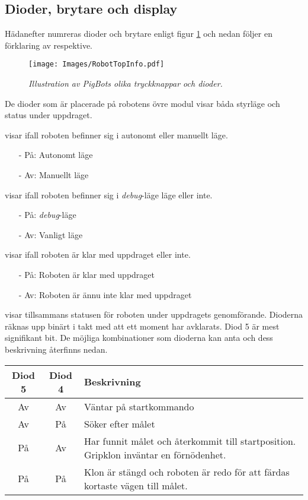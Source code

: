 \documentclass[11pt]{article}
\begin{document}
\subsection{Dioder, brytare och display}
Hädanefter numreras dioder och brytare enligt figur \ref{picTop} och nedan följer en förklaring av respektive.

\begin{figure}[htbp]
	\centering
	\texttt{[image: Images/RobotTopInfo.pdf]}
	\caption{\textit{Illustration av PigBots olika tryckknappar och dioder.} \label{picTop}}
\end{figure}

De dioder som är placerade på robotens övre modul visar båda styrläge och status under uppdraget.
\begin{description}[style=unboxed, leftmargin=0cm]
  \item[Diod 1] visar ifall roboten befinner sig i autonomt eller manuellt läge. 
    \begin{itemize}
      \setlength\itemsep{-0.5em}
      \item[-] På: Autonomt läge 
      \item[-] Av: Manuellt läge
    \end{itemize}
  \item[Diod 2] visar ifall roboten befinner sig i \textit{debug}-läge läge eller inte.
    \begin{itemize}
      \setlength\itemsep{-0.5em}
      \item[-] På: \textit{debug}-läge
      \item[-] Av: Vanligt läge
    \end{itemize}
  \item[Diod 3] visar ifall roboten är klar med uppdraget eller inte.
    \begin{itemize}
      \setlength\itemsep{-0.5em}
      \item[-] På: Roboten är klar med uppdraget
      \item[-] Av: Roboten är ännu inte klar med uppdraget
    \end{itemize}
  \item[Diod 4 och 5] visar tillsammans statusen för roboten under uppdragets genomförande. Dioderna räknas upp binärt i takt med att ett moment har avklarats. Diod 5 är mest signifikant bit. De möjliga kombinationer som dioderna kan anta och dess beskrivning återfinns nedan.

    \hspace{2em}\begin{tabular}{c c p{8cm}}
	Diod 5 & Diod 4 & Beskrivning \\ \hline
	Av & Av & Väntar på startkommando \\
	Av & På & Söker efter målet \\
	På & Av & Har funnit målet och återkommit till startposition. Gripklon inväntar en förnödenhet. \\
	På & På & Klon är stängd och roboten är redo för att färdas kortaste vägen till målet.

    \end{tabular}
\end{description}
\end{document}
